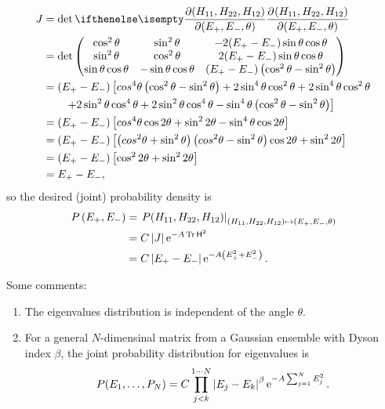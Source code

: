 \documentclass[a4paper,11pt,twoside]{article}
\begin{document}
            \begin{align}
                J&=\det\partialderivative{\left(H_{11},H_{22},H_{12}\right)}{\left(E_{+},E_{-},\theta\right)}\nonumber\\
                    &=\det\makematrix{\cos^{2}\theta & \sin^{2}\theta & -2(E_{+}-E_{-})\sin\theta\cos\theta \\
                        \sin^{2}\theta & \cos^{2}\theta & 2(E_{+}-E_{-})\sin\theta\cos\theta \\
                        \sin\theta\cos\theta & -\sin\theta\cos\theta & (E_{+}-E_{-})\left(\cos^{2}\theta-\sin^{2}\theta\right)}\nonumber\\
                    &=\left(E_{+}-E_{-}\right)\left[cos^{4}\theta\left(\cos^{2}\theta-\sin^{2}\theta\right)+2\sin^{4}\theta\cos^{2}\theta+2\sin^{4}\theta\cos^{2}\theta\right.\nonumber\\
                    &\qquad\left.+2\sin^{2}\theta\cos^{4}\theta+2\sin^{2}\theta\cos^{4}\theta-\sin^{4}\theta\left(\cos^{2}\theta-\sin^{2}\theta\right)\right]\nonumber\\
                    &=\left(E_{+}-E_{-}\right)\left[cos^{4}\theta\cos2\theta+\sin^{2}2\theta-\sin^{4}\theta\cos2\theta\right]\nonumber\\
                    &=\left(E_{+}-E_{-}\right)\left[\left(cos^{2}\theta+\sin^{2}\theta\right)\left(cos^{2}\theta-\sin^{2}\theta\right)\cos2\theta+\sin^{2}2\theta\right]\nonumber\\
                    &=\left(E_{+}-E_{-}\right)\left[\cos^{2}2\theta+\sin^{2}2\theta\right]\nonumber\\
                    &=E_{+}-E_{-},
            \end{align}
            so the desired (joint) probability density is
            \begin{align}
                P\left(E_{+},E_{-}\right)
                    &=\left. P(H_{11},H_{22},H_{12})\right|
                        _{\left(H_{11},H_{22},H_{12}\right)\mapsto{\left(E_{+},E_{-},\theta\right)}}\nonumber\\
                    &=C\left|{J}\right|\operatorname{e}^{-A\operatorname{Tr}{\mathsf{H}^{2}}}\nonumber\\
                    \label{eq:PE2}
                    &=C\left|{E_{+}-E_{-}}\right|\operatorname{e}^{-A\left(E_{+}^{2}+E_{-}^{2}\right)}.
            \end{align}

            Some comments:
            \begin{enumerate}
                \item The eigenvalues distribution is independent of the angle $\theta$.
                \item For a general $N$-dimensinal matrix from a Gaussian ensemble with Dyson index $\beta$, the joint probability distribution for eigenvalues is
                    \begin{equation}
                        \label{eq:PE}
                        P(E_{1},\dotsc,P_{N})=C\prod_{j<k}^{1\dotsb N}\left|{E_{j}-E_{k}}\right|^{\beta}\operatorname{e}^{-A\sum_{j=1}^{N}E_{j}^{2}}.
                    \end{equation}
            \end{enumerate}
\end{document}
